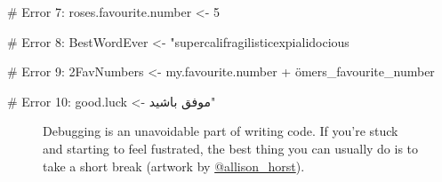 \documentclass[
  letterpaper,
  DIV=11,
  numbers=noendperiod]{scrreprt}
\newenvironment{Shaded}{\begin{snugshade}}{\end{snugshade}}
\newcommand{\CommentTok}[1]{\textcolor[rgb]{0.37,0.37,0.37}{#1}}
\newcommand{\NormalTok}[1]{\textcolor[rgb]{0.00,0.23,0.31}{#1}}
\newcommand{\StringTok}[1]{\textcolor[rgb]{0.13,0.47,0.30}{#1}}
\begin{document}
\begin{tcolorbox}
\begin{Shaded}
\begin{Highlighting}[]
\CommentTok{\# Error 7:}
\NormalTok{rose}\StringTok{\textquotesingle{}s.favourite.number \textless{}{-} 5}

\StringTok{\# Error 8:}
\StringTok{BestWordEver \textless{}{-} "supercalifragilisticexpialidocious}

\StringTok{\# Error 9:}
\StringTok{2FavNumbers \textless{}{-} my.favourite.number + ömers\_favourite\_number}

\StringTok{\# Error 10:}
\StringTok{good.luck \textless{}{-} موفق باشيد"}
\end{Highlighting}
\end{Shaded}

\end{tcolorbox}

\begin{figure}


\caption{\label{fig-ErrorMonster}Debugging is an unavoidable part of
writing code. If you're stuck and starting to feel fustrated, the best
thing you can usually do is to take a short break (artwork by
\href{https://allisonhorst.com/allison-horst}{@allison\_horst}).}

\end{figure}%
\end{document}
